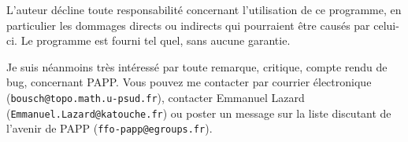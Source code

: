 \documentclass[10pt]{article}
\begin{document}
	L'auteur décline toute responsabilité concernant
l'utilisation de ce programme, en particulier les dommages directs ou
indirects qui pourraient être causés par celui-ci.  Le programme est
fourni tel quel, sans aucune garantie.

Je suis néanmoins très intéressé par toute remarque, critique, 
compte rendu de bug, concernant PAPP. Vous pouvez me contacter par 
courrier électronique
(\verb|bousch@topo.math.u-psud.fr|), contacter Emmanuel Lazard (\verb|Emmanuel.Lazard@katouche.fr|) ou poster un message sur la liste 
discutant de l'avenir de PAPP (\verb|ffo-papp@egroups.fr|).

\newpage
\tableofcontents
\end{document}

